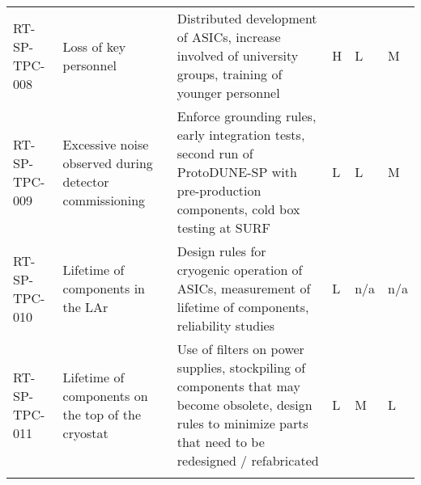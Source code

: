 \begin{footnotesize}
\begin{longtable}{P{0.18\textwidth}P{0.20\textwidth}P{0.32\textwidth}P{0.02\textwidth}P{0.02\textwidth}P{0.02\textwidth}}
RT-SP-TPC-008 & Loss of key personnel & Distributed development of ASICs, increase involved of university groups, training of younger personnel & H & L & M \\  \colhline
RT-SP-TPC-009 & Excessive noise observed during detector commissioning & Enforce grounding rules, early integration tests, second run of ProtoDUNE-SP with pre-production components, cold box testing at SURF & L & L & M \\  \colhline
RT-SP-TPC-010 & Lifetime of components in the LAr & Design rules for cryogenic operation of ASICs, measurement of lifetime of components, reliability studies & L & n/a & n/a \\  \colhline
RT-SP-TPC-011 & Lifetime of components on the top of the cryostat & Use of filters on power supplies, stockpiling of components that may become obsolete, design rules to minimize parts that need to be redesigned / refabricated & L & M & L \\  \colhline

\label{tab:risks:SP-FD-TPCELEC}
\end{longtable}
\end{footnotesize}
